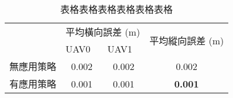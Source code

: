 \begin{table}[H]
\centering
\caption{表格表格表格表格表格表格}
\label{t:sim30_with_no_formation}
\begin{tabularx}{\textwidth}{|c|X|X|c|}
\hline
\multirow{2}{*}{} & \multicolumn{2}{c|}{平均橫向誤差 (m)} & \multirow{2}{*}{平均縱向誤差 (m)} \\ \cline{2-3}
 & \multicolumn{1}{X|}{\centering UAV0} & \multicolumn{1}{X|}{\centering UAV1} &  \\ \hline
無應用策略 & \multicolumn{1}{c|}{0.002} &  \multicolumn{1}{c|}{0.002} & 0.002 \\ \hline
有應用策略 & \multicolumn{1}{c|}{0.001} &  \multicolumn{1}{c|}{0.001} &  \textbf{0.001} \\ \hline
\end{tabularx}
\end{table}